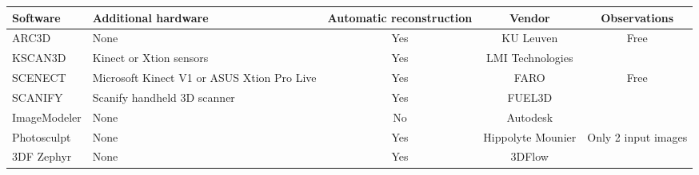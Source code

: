 \documentclass[scriptsize,a4paper,twoside,openright]{report}
\begin{document}
\begin{center}
\begin{table}
\begin{tabularx}{\textwidth}{@{} Y Y c c c @{}} %
\toprule
\textbf{Software} & \textbf{Additional hardware} & \textbf{Automatic reconstruction} & \textbf{Vendor} & \textbf{Observations}\\ \hline
\midrule
ARC3D &   None       &     Yes      &   KU Leuven & Free\\ \hline \addlinespace
KSCAN3D &  Kinect or Xtion sensors & Yes & LMI Technologies& \\ \hline \addlinespace
SCENECT & Microsoft Kinect V1 or ASUS Xtion Pro Live& Yes & FARO & Free\\ \hline \addlinespace
SCANIFY& Scanify handheld 3D scanner& Yes & FUEL3D &\\ \hline \addlinespace 
ImageModeler&   None       &     No      &   Autodesk & \\  \hline \addlinespace
Photosculpt&  None      &    Yes       & Hippolyte Mounier &Only 2 input images\\ \hline \addlinespace
3DF Zephyr&   None       &     Yes      &   3DFlow & \\  
\bottomrule
\end{tabularx}
\label{table:nonlin}
\end{table}
\end{center}
\end{document}
